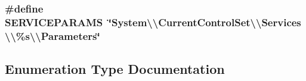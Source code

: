 \subsubsection[{\texorpdfstring{S\+E\+R\+V\+I\+C\+E\+P\+A\+R\+A\+MS}{SERVICEPARAMS}}]{\setlength{\rightskip}{0pt plus 5cm}\#define S\+E\+R\+V\+I\+C\+E\+P\+A\+R\+A\+MS~\char`\"{}System\textbackslash{}\textbackslash{}\+Current\+Control\+Set\textbackslash{}\textbackslash{}\+Services\textbackslash{}\textbackslash{}\%s\textbackslash{}\textbackslash{}\+Parameters\char`\"{}}\hypertarget{group__APACHE__MPM__WINNT_gaa61e8b42448defae941ff4c7740aa052}{}\label{group__APACHE__MPM__WINNT_gaa61e8b42448defae941ff4c7740aa052}


\subsection{Enumeration Type Documentation}
